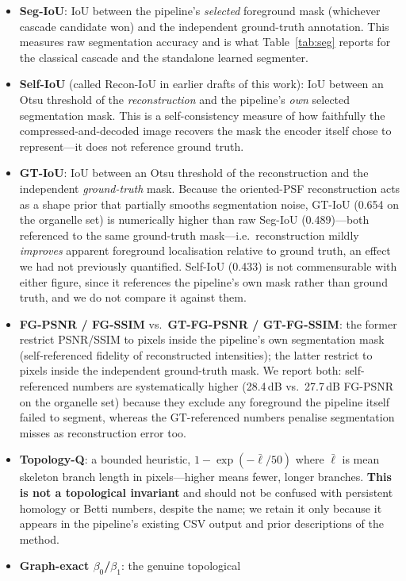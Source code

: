 \documentclass[10pt,a4paper]{article}
\begin{document}
\begin{itemize}
\item \textbf{Seg-IoU}: IoU between the pipeline's \emph{selected} foreground
mask (whichever cascade candidate won) and the independent ground-truth
annotation. This measures raw segmentation accuracy and is what Table~\ref{tab:seg}
reports for the classical cascade and the standalone learned segmenter.
\item \textbf{Self-IoU} (called Recon-IoU in earlier drafts of this work):
IoU between an Otsu threshold of the \emph{reconstruction} and the
pipeline's \emph{own} selected segmentation mask. This is a self-consistency
measure of how faithfully the compressed-and-decoded image recovers the mask
the encoder itself chose to represent---it does not reference ground truth.
\item \textbf{GT-IoU}: IoU between an Otsu threshold of the reconstruction and
the independent \emph{ground-truth} mask. Because the oriented-PSF
reconstruction acts as a shape prior that partially smooths segmentation
noise, GT-IoU (0.654 on the organelle set) is
numerically higher than raw Seg-IoU (0.489)---both referenced to the same
ground-truth mask---i.e.\ reconstruction mildly \emph{improves} apparent
foreground localisation relative to ground truth, an effect we had not
previously quantified. Self-IoU (0.433) is not commensurable with either
figure, since it references the pipeline's own mask rather than ground truth,
and we do not compare it against them.
\item \textbf{FG-PSNR / FG-SSIM} vs.\ \textbf{GT-FG-PSNR / GT-FG-SSIM}: the
former restrict PSNR/SSIM to pixels inside the pipeline's own segmentation
mask (self-referenced fidelity of reconstructed intensities); the latter
restrict to pixels inside the independent ground-truth mask. We report both:
self-referenced numbers are systematically higher (28.4\,dB vs.\ 27.7\,dB
FG-PSNR on the organelle set) because they exclude any foreground the
pipeline itself failed to segment, whereas the GT-referenced numbers
penalise segmentation misses as reconstruction error too.
\item \textbf{Topology-Q}: a bounded heuristic,
$1-\exp(-\bar{\ell}/50)$ where $\bar{\ell}$ is mean skeleton branch length in
pixels---higher means fewer, longer branches. \textbf{This is not a
topological invariant} and should not be confused with persistent homology or
Betti numbers, despite the name; we retain it only because it appears in the
pipeline's existing CSV output and prior descriptions of the method.
\item \textbf{Graph-exact $\beta_0$/$\beta_1$}: the genuine topological

\end{itemize}
\end{document}
